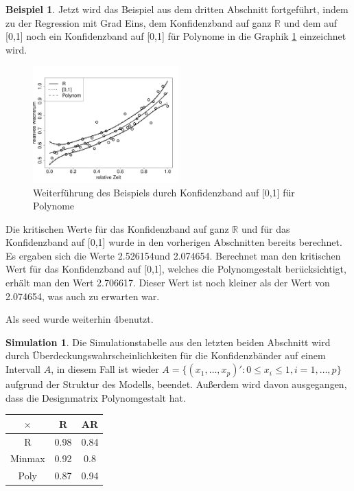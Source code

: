 \documentclass[12pt,a4paper]{article}
\theoremstyle{definition}
\newtheorem{Beispiel}[Definition]{Beispiel}
\theoremstyle{definition}
\theoremstyle{definition}
\newtheorem{Simulation}[Definition]{Simulation}
\theoremstyle{definition}
\newcommand{\cR}{2.526154}
\newcommand{\seedsimulation}{4}
\newcommand{\cA}{2.074654}
\newcommand{\cAP}{2.706617}
\newcommand{\UeberRR}{0.98}
\newcommand{\UeberRMinmax}{0.92}
\newcommand{\UeberRMinmaxPoly}{0.87}
\newcommand{\UeberARR}{0.84}
\newcommand{\UeberARMinmax}{0.8}
\newcommand{\UeberARMinmaxPoly}{0.94}
\begin{document}
\begin{Beispiel}
Jetzt wird das Beispiel aus dem dritten Abschnitt fortgeführt, indem zu der Regression mit Grad Eins, dem Konfidenzband auf ganz $\mathbb{R}$ und dem auf [0,1] noch ein Konfidenzband auf [0,1] für Polynome in die Graphik \ref{KB-poly-BSP} einzeichnet wird.

\begin{figure}[H] 
  \centering
     \includegraphics[width=0.5\textwidth]{Bsp-KB-poly}
  \caption{Weiterführung des Beispiels durch Konfidenzband auf [0,1] für Polynome}
  \label{KB-poly-BSP}
\end{figure}

Die kritischen Werte für das Konfidenzband auf ganz $\mathbb{R}$ und für das Konfidenzband auf [0,1] wurde in den vorherigen Abschnitten bereits berechnet. Es ergaben sich die Werte \cR und \cA . Berechnet man den kritischen Wert für das Konfidenzband auf [0,1], welches die Polynomgestalt berücksichtigt, erhält man den Wert \cAP . Dieser Wert ist noch kleiner als der Wert von \cA , was auch zu erwarten war.

Als seed wurde weiterhin \seedsimulation benutzt.

\end{Beispiel}

\begin{Simulation}
Die Simulationstabelle aus den letzten beiden Abschnitt wird durch Überdeckungswahrscheinlichkeiten für die Konfidenzbänder auf einem Intervall $A$, in diesem Fall ist wieder $A = \{ (x_1, \ldots, x_p)' : 0 \leq x_i \leq 1, i=1, \ldots, p \}$ aufgrund der Struktur des Modells, beendet. Außerdem wird davon ausgegangen, dass die Designmatrix Polynomgestalt hat.

\begin{center}
\begin{tabular}{|c|c|c|}
\hline 
$\times$ & R & AR \\ 
\hline 
R		& \UeberRR			& \UeberARR \\ 
\hline 
Minmax	& \UeberRMinmax	 	& \UeberARMinmax \\ 
\hline 
Poly 	& \UeberRMinmaxPoly & \UeberARMinmaxPoly \\ 
\hline 
\end{tabular} 
\end{center}

\end{Simulation}
\end{document}
